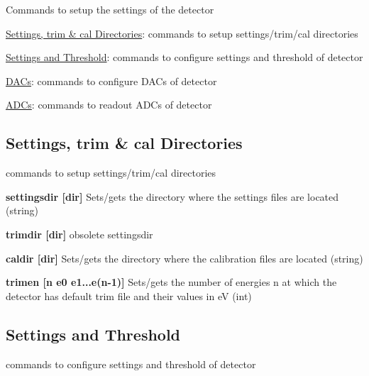 Commands to setup the settings of the detector
\begin{DoxyItemize}
\item \hyperlink{settings_settingsdir}{Settings, trim \& cal Directories}: commands to setup settings/trim/cal directories
\item \hyperlink{settings_settingssett}{Settings and Threshold}: commands to configure settings and threshold of detector
\item \hyperlink{settings_settingsdacs}{DACs}: commands to configure DACs of detector
\item \hyperlink{settings_settingsadcs}{ADCs}: commands to readout ADCs of detector
\end{DoxyItemize}\hypertarget{settings_settingsdir}{}\subsection{Settings, trim \& cal Directories}\label{settings_settingsdir}
commands to setup settings/trim/cal directories


\begin{DoxyItemize}
\item {\bfseries settingsdir \mbox{[}dir\mbox{]}} Sets/gets the directory where the settings files are located (string)
\end{DoxyItemize}


\begin{DoxyItemize}
\item {\bfseries trimdir \mbox{[}dir\mbox{]}} obsolete {\ttfamily settingsdir} 
\end{DoxyItemize}


\begin{DoxyItemize}
\item {\bfseries caldir \mbox{[}dir\mbox{]}} Sets/gets the directory where the calibration files are located (string)
\end{DoxyItemize}


\begin{DoxyItemize}
\item {\bfseries trimen \mbox{[}n e0 e1...e(n-\/1)\mbox{]}} Sets/gets the number of energies n at which the detector has default trim file and their values in eV (int)
\end{DoxyItemize}\hypertarget{settings_settingssett}{}\subsection{Settings and Threshold}\label{settings_settingssett}
commands to configure settings and threshold of detector


